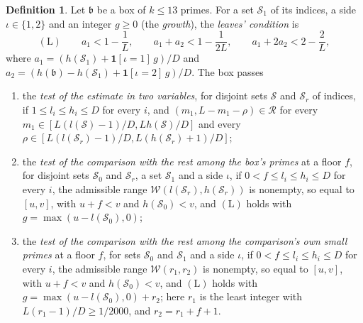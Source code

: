 \documentclass[11pt]{article}
\theoremstyle{definition}
\newtheorem{definition}[theorem]{Definition}
\begin{document}
\begin{definition}\label{def:tests}
Let $\mathfrak b$ be a box of $k \le 13$ primes. For a set $\mathcal S_1$ of its indices, a side $\iota \in \{1, 2\}$
and
an integer $g \ge 0$ (the \emph{growth}), the \emph{leaves' condition} is
\[
  (\mathrm L) \qquad a_1 < 1 - \frac1L, \qquad a_1 + a_2 < 1 - \frac1{2L}, \qquad a_1 + 2a_2 < 2 - \frac2L,
\]
where $a_1 = (h(\mathcal S_1) + \mathbf 1[\iota = 1]\, g)/D$ and $a_2 = (h(\mathfrak b) - h(\mathcal S_1) + \mathbf
1[\iota = 2]\, g)/D$. The box passes
\begin{enumerate}
\item[(I)] the \emph{test of the estimate in two variables}, for disjoint sets $\mathcal S$ and $\mathcal S_r$ of
  indices, if $1 \le l_i \le h_i \le D$ for every $i$, and $(m_1, L - m_1 - \rho) \in \mathcal R$ for every $m_1 \in
  [L(l(\mathcal S) - 1)/D, Lh(\mathcal S)/D]$ and every $\rho \in [L(l(\mathcal S_r) - 1)/D, L(h(\mathcal S_r) + 1)/D]$;
\item[(J2)] the \emph{test of the comparison with the rest among the box's primes} at a floor $f$, for disjoint sets
  $\mathcal S_0$ and $\mathcal S_r$, a set $\mathcal S_1$ and a side $\iota$, if $0 < f \le l_i \le h_i \le D$ for every
  $i$, the admissible range $\mathcal W(l(\mathcal S_r), h(\mathcal S_r))$ is nonempty, so equal to $[u, v]$, with
  $u + f < v$ and $h(\mathcal S_0) < v$, and
  $(\mathrm L)$ holds with $g = \max(u - l(\mathcal S_0), 0)$;
\item[(J3)] the \emph{test of the comparison with the rest among the comparison's own small primes} at a floor $f$,
for sets $\mathcal
  S_0$ and $\mathcal S_1$ and a side $\iota$, if $0 < f \le l_i \le h_i \le D$ for every $i$, the admissible
  range $\mathcal W(r_1, r_2)$ is nonempty, so equal to $[u, v]$, with $u + f < v$ and $h(\mathcal S_0) < v$, and
  $(\mathrm L)$ holds with $g = \max(u - l(\mathcal S_0),
  0) + r_2$; here $r_1$ is the least integer with $L(r_1 - 1)/D \ge 1/2000$, and $r_2 = r_1 + f + 1$.
\end{enumerate}
\end{definition}
\end{document}
